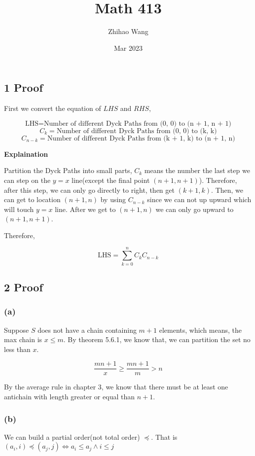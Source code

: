 \documentclass{article}
\title{Math 413}
\author{Zhihao Wang}
\date{Mar 2023}
\begin{document}
\maketitle

\subsection*{1 Proof}

First we convert the equation of $LHS$ and $RHS$,

$$\text{LHS} = \text{Number of different Dyck Paths from (0, 0) to (n + 1, n + 1)}$$
$$ C_k = \text{Number of different Dyck Paths from (0, 0) to (k, k)}$$
$$ C_{n-k} = \text{Number of different Dyck Paths from (k + 1, k) to (n + 1,  n)}$$

\textbf{Explaination}

Partition the Dyck Paths into small parts, $C_k$ means the number the last step we can step on the $y = x$ line(except the final point $(n + 1, n + 1)$). Therefore, after this step, we can only go directly to right, then get $(k + 1, k)$. Then, we can get to location $(n + 1, n)$ by using $C_{n-k}$ since we can not up upward which will touch $y = x$ line. After we get to $(n + 1, n)$ we can only go upward to $(n + 1, n + 1)$. 

Therefore,

$$\text{LHS} = \sum \limits_{k=0}^{n} C_kC_{n-k}$$

\subsection*{2 Proof}

\subsubsection*{(a)}
    Suppose $S$ does not have a chain containing $m + 1$ elements, which means, the max chain is $x \le m$. By theorem 5.6.1, we know that, we can partition the set no less than $x$.

    $$\frac{mn + 1}{x} \ge \frac{mn + 1}{m} > n$$

    By the average rule in chapter 3, we know that there must be at least one antichain with length greater or equal than $n + 1$.
    
\subsubsection*{(b)}
    We can build a partial order(not total order) $ \preceq	$. That is $(a_i, i) \preceq (a_j, j) \iff a_i \le a_j \land i \le j $
\end{document}
